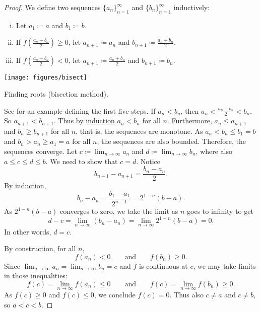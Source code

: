 \begin{proof}
We define two sequences $\{ a_n \}_{n=1}^\infty$
and $\{ b_n \}_{n=1}^\infty$ inductively:
\begin{enumerate}[(i)]
\item Let $a_1 \coloneqq a$ and $b_1 \coloneqq b$.
\item If $f\left(\frac{a_n+b_n}{2}\right) \geq 0$, let $a_{n+1} \coloneqq a_n$ and
$b_{n+1} \coloneqq \frac{a_n+b_n}{2}$.
\item If $f\left(\frac{a_n+b_n}{2}\right) < 0$, let $a_{n+1} \coloneqq \frac{a_n+b_n}{2}$ and
$b_{n+1} \coloneqq b_n$.
\end{enumerate}
\begin{myfigureht}
\texttt{[image: figures/bisect]}
\caption{Finding roots (bisection method).\label{bisectfig}}
\end{myfigureht}
See  for an example defining the first five steps.
If $a_n < b_n$, then $a_n < \frac{a_n+b_n}{2} < b_n$.  So
$a_{n+1} < b_{n+1}$.
Thus by \hyperref[induction:thm]{induction} $a_n < b_n$ for all $n$.
Furthermore, $a_n \leq a_{n+1}$ and 
$b_n \geq b_{n+1}$ for all $n$, that is, the sequences are monotone.
As $a_n < b_n \leq b_1 = b$ and 
$b_n > a_n \geq a_1 = a$ for all $n$,
the sequences are also bounded.  Therefore, the
sequences converge.
Let $c \coloneqq \lim_{n\to\infty} a_n$ and $d \coloneqq \lim_{n\to\infty} b_n$,
where also $a \leq c \leq d \leq b$.  We need
to show that $c=d$.
Notice
\begin{equation*}
b_{n+1} - a_{n+1} = \frac{b_n-a_n}{2}.
\end{equation*}
By \hyperref[induction:thm]{induction},
\begin{equation*}
b_n - a_n = \frac{b_1-a_1}{2^{n-1}} = 2^{1-n} (b-a) .
\end{equation*}
As $2^{1-n}(b-a)$ converges to zero, we take the limit as $n$ goes to
infinity to get
\begin{equation*}
d-c = \lim_{n\to\infty} (b_n - a_n) =
\lim_{n\to\infty} 2^{1-n} (b-a) = 0.
\end{equation*}
In other words, $d=c$.

By construction, for all $n$,
\begin{equation*}
f(a_n) < 0
\qquad \text{and} \qquad
f(b_n) \geq 0 .
\end{equation*}
Since
$\lim_{n\to\infty} a_n = \lim_{n\to\infty} b_n = c$
and $f$ is continuous at $c$, we may take 
limits in those inequalities:
\begin{equation*}
f(c) = \lim_{n\to\infty} f(a_n) \leq 0
\qquad \text{and} \qquad
f(c) = \lim_{n\to\infty} f(b_n) \geq 0 .
\end{equation*}
As $f(c) \geq 0$ and 
$f(c) \leq 0$, we conclude $f(c) = 0$.
Thus also $c \not=a$ and $c \not= b$, so
$a < c < b$.
\end{proof}

